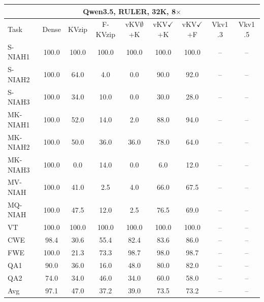 \begin{tabular}{lcccccccc}
\toprule
\multicolumn{9}{c}{Qwen3.5, RULER, 32K, 8$\times$} \\
\midrule
Task & Dense & KVzip & F-KVzip & vKV$\emptyset$+K & vKV$\checkmark$+K & vKV$\checkmark$+F & Vkv1 .3 & Vkv1 .5 \\
\midrule
S-NIAH1 & 100.0 & 100.0 & 100.0 & 100.0 & 100.0 & 100.0 & -- & -- \\
S-NIAH2 & 100.0 & 64.0 & 4.0 & 0.0 & 90.0 & 92.0 & -- & -- \\
S-NIAH3 & 100.0 & 34.0 & 10.0 & 0.0 & 30.0 & 28.0 & -- & -- \\
MK-NIAH1 & 100.0 & 52.0 & 14.0 & 2.0 & 88.0 & 94.0 & -- & -- \\
MK-NIAH2 & 100.0 & 50.0 & 36.0 & 36.0 & 78.0 & 64.0 & -- & -- \\
MK-NIAH3 & 100.0 & 0.0 & 14.0 & 0.0 & 6.0 & 12.0 & -- & -- \\
MV-NIAH & 100.0 & 41.0 & 2.5 & 4.0 & 66.0 & 67.5 & -- & -- \\
MQ-NIAH & 100.0 & 47.5 & 12.0 & 2.5 & 76.5 & 69.0 & -- & -- \\
VT & 100.0 & 100.0 & 100.0 & 100.0 & 100.0 & 100.0 & -- & -- \\
CWE & 98.4 & 30.6 & 55.4 & 82.4 & 83.6 & 86.0 & -- & -- \\
FWE & 100.0 & 21.3 & 73.3 & 98.7 & 98.0 & 98.7 & -- & -- \\
QA1 & 90.0 & 36.0 & 16.0 & 48.0 & 80.0 & 82.0 & -- & -- \\
QA2 & 74.0 & 34.0 & 46.0 & 34.0 & 60.0 & 58.0 & -- & -- \\
\midrule
Avg & 97.1 & 47.0 & 37.2 & 39.0 & 73.5 & 73.2 & -- & -- \\
\bottomrule
\end{tabular}
\vspace{0.8em}

